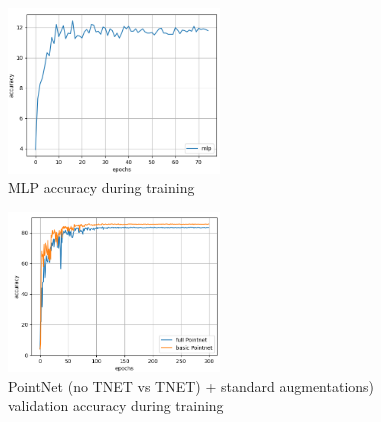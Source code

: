 \documentclass[a4paper]{article}
\begin{document}
    
\begin{figure}[H]
    \centering
    \includegraphics[width=0.5\textwidth]{figures/Q1.png}
    \caption{MLP accuracy during training}
    \label{fig:MLP}
\end{figure}

\begin{figure}[H]
    \centering
    \includegraphics[width=0.5\textwidth]{figures/Q3.png}
    \caption{PointNet (no TNET vs TNET) + standard augmentations) validation accuracy during training}
    \label{fig:pointNet}
\end{figure}
\end{document}
